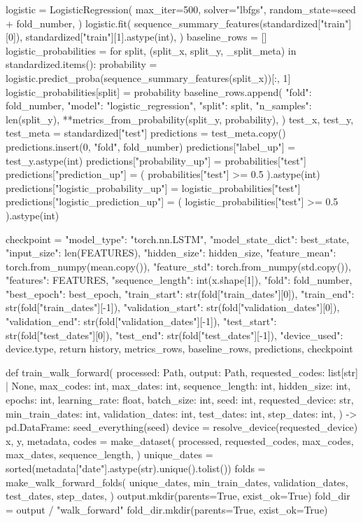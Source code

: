 \documentclass[UTF8,a4paper,fontset=fandol]{ctexart}
\begin{document}
\begin{ProjectCode}
{{    logistic = LogisticRegression(
        max_iter=500,
        solver="lbfgs",
        random_state=seed + fold_number,
    )
    logistic.fit(
        sequence_summary_features(standardized["train"][0]),
        standardized["train"][1].astype(int),
    )
    baseline_rows = []
    logistic_probabilities = {}
    for split, (split_x, split_y, _split_meta) in standardized.items():
        probability = logistic.predict_proba(sequence_summary_features(split_x))[:, 1]
        logistic_probabilities[split] = probability
        baseline_rows.append({
            "fold": fold_number,
            "model": "logistic_regression",
            "split": split,
            "n_samples": len(split_y),
            **metrics_from_probability(split_y, probability),
        })
    test_x, test_y, test_meta = standardized["test"]
    predictions = test_meta.copy()
    predictions.insert(0, "fold", fold_number)
    predictions["label_up"] = test_y.astype(int)
    predictions["probability_up"] = probabilities["test"]
    predictions["prediction_up"] = (
        probabilities["test"] >= 0.5
    ).astype(int)
    predictions["logistic_probability_up"] = logistic_probabilities["test"]
    predictions["logistic_prediction_up"] = (
        logistic_probabilities["test"] >= 0.5
    ).astype(int)

    checkpoint = {
        "model_type": "torch.nn.LSTM",
        "model_state_dict": best_state,
        "input_size": len(FEATURES),
        "hidden_size": hidden_size,
        "feature_mean": torch.from_numpy(mean.copy()),
        "feature_std": torch.from_numpy(std.copy()),
        "features": FEATURES,
        "sequence_length": int(x.shape[1]),
        "fold": fold_number,
        "best_epoch": best_epoch,
        "train_start": str(fold["train_dates"][0]),
        "train_end": str(fold["train_dates"][-1]),
        "validation_start": str(fold["validation_dates"][0]),
        "validation_end": str(fold["validation_dates"][-1]),
        "test_start": str(fold["test_dates"][0]),
        "test_end": str(fold["test_dates"][-1]),
        "device_used": device.type,
    }
    return history, metrics_rows, baseline_rows, predictions, checkpoint


def train_walk_forward(
    processed: Path,
    output: Path,
    requested_codes: list[str] | None,
    max_codes: int,
    max_dates: int,
    sequence_length: int,
    hidden_size: int,
    epochs: int,
    learning_rate: float,
    batch_size: int,
    seed: int,
    requested_device: str,
    min_train_dates: int,
    validation_dates: int,
    test_dates: int,
    step_dates: int,
) -> pd.DataFrame:
    seed_everything(seed)
    device = resolve_device(requested_device)
    x, y, metadata, codes = make_dataset(
        processed,
        requested_codes,
        max_codes,
        max_dates,
        sequence_length,
    )
    unique_dates = sorted(metadata["date"].astype(str).unique().tolist())
    folds = make_walk_forward_folds(
        unique_dates,
        min_train_dates,
        validation_dates,
        test_dates,
        step_dates,
    )
    output.mkdir(parents=True, exist_ok=True)
    fold_dir = output / "walk_forward"
    fold_dir.mkdir(parents=True, exist_ok=True)

}}
\end{ProjectCode}
\end{document}
